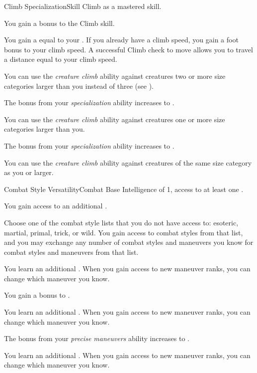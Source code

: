     \begin{feat}{Climb Specialization}{Skill}
        \featpre Climb as a mastered skill.

         You gain a  bonus to the Climb skill.

         You gain a  equal to your .
        If you already have a climb speed, you gain a  foot bonus to your climb speed.
        A successful Climb check to move allows you to travel a distance equal to your climb speed.

         You can use the \textit{creature climb} ability against creatures two or more size categories larger than you instead of three (see ).

         The bonus from your \textit{specialization} ability increases to .

         You can use the \textit{creature climb} ability against creatures one or more size categories larger than you.

         The bonus from your \textit{specialization} ability increases to .

         You can use the \textit{creature climb} ability against creatures of the same size category as you or larger.
    \end{feat}

    \begin{feat}{Combat Style Versatility}{Combat}
        \featpre Base Intelligence of 1, access to at least one .

         You gain access to an additional .

         Choose one of the combat style lists that you do not have access to: esoteric, martial, primal, trick, or wild.
        You gain access to combat styles from that list, and you may exchange any number of combat styles and maneuvers you know for combat styles and maneuvers from that list.

         You learn an additional .
        When you gain access to new maneuver ranks, you can change which maneuver you know.

         You gain a  bonus to .

         You learn an additional .
        When you gain access to new maneuver ranks, you can change which maneuver you know.

         The bonus from your \textit{precise maneuvers} ability increases to .

         You learn an additional .
        When you gain access to new maneuver ranks, you can change which maneuver you know.
    \end{feat}

